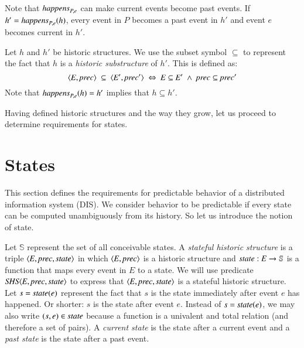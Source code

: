 \documentclass{elsarticle}
\def\id#1{\text{\em #1\/}}
\def\Events{{\mathit E}}
\begin{document}
	Note that $\id{happens}_{P,e}$ can make current events become past events.
	If $h'=\id{happens}_{P,e}(h)$, every event in $P$ becomes a past event in $h'$ and event $e$ becomes current in $h'$.

	Let $h$ and $h'$ be historic structures.
	We use the subset symbol $\subseteq$ to represent the fact that $h$ is a {\em historic substructure} of $h'$.
	This is defined as:
\begin{equation}
\label{def:historic substructure}
	\la \Events, \id{prec}\ra\ \subseteq\ \la \Events', \id{prec}'\ra\ \Leftrightarrow\ \Events\subseteq\Events'\ \wedge\ \id{prec}\subseteq\id{prec}'
\end{equation}
	Note that $\id{happens}_{P,e}(h)=h'$ implies that $h\subseteq h'$.

	Having defined historic structures and the way they grow, let us proceed to determine requirements for states.

\section{States}
	This section defines the requirements for predictable behavior of a distributed information system (DIS).
	We consider behavior to be predictable if every state can be computed unambiguously from its history.
	So let us introduce the notion of state.

	Let $\mathbb S$ represent the set of all conceivable states.
	A {\em stateful historic structure} is a triple $\la\Events, \id{prec}, \id{state}\ra$ in which
	$\la \Events, \id{prec}\ra$ is a historic structure and $\id{state}:\Events\rightarrow{\mathbb S}$ is a function
	that maps every event in $\Events$ to a state.
	We will use predicate $\id{SHS}\la \Events, \id{prec}, \id{state}\ra$
	to express that $\la \Events, \id{prec}, \id{state}\ra$ is a stateful historic structure.
	Let $s=\id{state}(e)$ represent the fact that $s$ is the state immediately after event $e$ has happened.
	Or shorter: $s$ is the state after event $e$.
	Instead of $s=\id{state}(e)$, we may also write $(s,e)\in\id{state}$ because a function is a univalent and total relation
	(and therefore a set of pairs).
	A {\em current state} is the state after a current event
	and a {\em past state} is the state after a past event.
\end{document}
